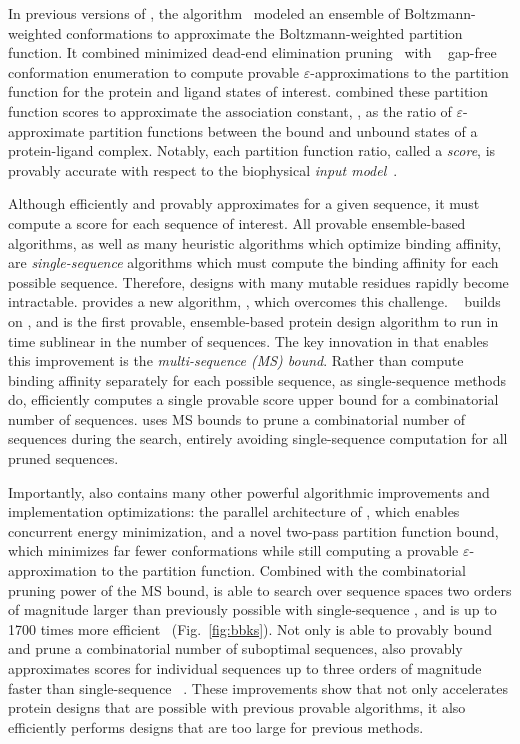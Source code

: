 \def\multisequencebound{MS\xspace}
\def\msbound{\multisequencebound}


\newcommand{\cut}[1]{}

In previous versions of \osprey, the \ks algorithm~\cite{K*} modeled an ensemble of Boltzmann-weighted conformations to approximate the Boltzmann-weighted partition function. It combined minimized dead-end elimination pruning~\cite{DEE} with \as~\cite{DEE,A*} gap-free conformation enumeration to compute provable $\varepsilon$-approximations to the partition function for the protein and ligand states of interest. \ks combined these partition function scores to approximate the association constant, \ka, as the ratio of $\varepsilon$-approximate partition functions between the bound and unbound states of a protein-ligand complex. Notably, each partition function ratio, called a \ks \emph{score}, is provably accurate with respect to the biophysical \emph{input model}~\cite{K*,minDEE,iMinDEE}. 

Although \ks efficiently and provably approximates \ka for a given sequence, it must compute a \ks score for each sequence of interest. All provable ensemble-based algorithms, as well as many heuristic algorithms which optimize binding affinity, are \emph{single-sequence} algorithms which must compute the binding affinity for each possible sequence. Therefore, designs with many mutable residues rapidly become intractable.  provides a new algorithm, \bbks, which overcomes this challenge. \bbks~\cite{BBK*} builds on \ks, and is the first provable, ensemble-based protein design algorithm to run in time sublinear in the number of sequences. The key innovation in \bbks that enables this improvement is the \emph{multi-sequence (\msbound) bound}. Rather than compute binding affinity separately for each possible sequence, as single-sequence methods do, \bbks efficiently computes a single provable \ks score upper bound for a combinatorial number of sequences. \bbks uses \msbound bounds to prune a combinatorial number of sequences during the search, entirely avoiding single-sequence computation for all pruned sequences.

Importantly, \bbks also contains many other powerful algorithmic improvements and implementation optimizations: the parallel architecture of \bbks, which enables concurrent energy minimization, and a novel two-pass partition function bound, which minimizes far fewer conformations while still computing a provable $\varepsilon$-approximation to the partition function. Combined with the combinatorial pruning power of the \msbound bound, \bbks is able to search over sequence spaces two orders of magnitude larger than previously possible with single-sequence \ks, and is up to 1700 times more efficient~\cite{BBK*} (Fig.~\ref{fig:bbks}). Not only is \bbks able to provably bound and prune a combinatorial number of suboptimal sequences, \bbks also provably approximates \ks scores for individual sequences up to three orders of magnitude faster than single-sequence \ks~\cite{BBK*}. These improvements show that \bbks not only accelerates protein designs that are possible with previous provable algorithms, it also efficiently performs designs that are too large for previous methods.

